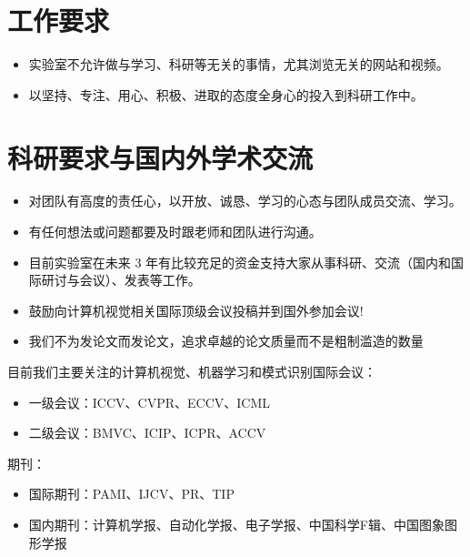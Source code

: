 \documentclass[a4paper，12pt]{article}
\begin{document}
\section{工作要求}

\begin{itemize}

\item 实验室不允许做与学习、科研等无关的事情，尤其浏览无关的网站和视频。

\item 以坚持、专注、用心、积极、进取的态度全身心的投入到科研工作中。

\end{itemize}

\section{科研要求与国内外学术交流}

\begin{itemize}

\item 对团队有高度的责任心，以开放、诚恳、学习的心态与团队成员交流、学习。

\item 有任何想法或问题都要及时跟老师和团队进行沟通。

\item 目前实验室在未来 3 年有比较充足的资金支持大家从事科研、交流（国内和国际研讨与会议）、发表等工作。

\item 鼓励向计算机视觉相关国际顶级会议投稿并到国外参加会议!

\item 我们不为发论文而发论文，追求卓越的论文质量而不是粗制滥造的数量

\end{itemize}

目前我们主要关注的计算机视觉、机器学习和模式识别国际会议：

\begin{itemize}

\item 一级会议：ICCV、CVPR、ECCV、ICML

\item 二级会议：BMVC、ICIP、ICPR、ACCV

\end{itemize}

期刊：

\begin{itemize}

\item 国际期刊：PAMI、IJCV、PR、TIP

\item 国内期刊：计算机学报、自动化学报、电子学报、中国科学F辑、中国图象图形学报

\end{itemize}
\end{document}
